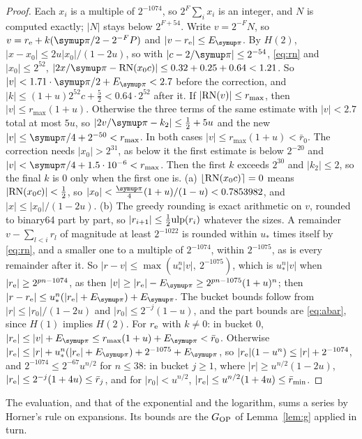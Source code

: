 \begin{proof}
Each $x_i$ is a multiple of $2^{-1074}$, so $2^F\sum_i x_i$ is an integer, and $N$ is computed exactly; $|N|$ stays
below $2^{F+54}$. Write $v = 2^{-F}N$, so $v = r_{\rm e} + k(\cpi/2 - 2^{-F}P)$ and $|v - r_{\rm e}| \le E_{\cpi}$. By $H(2)$,
$|x - x_0| \le 2u|x_0|/(1-2u)$, so with $|c - 2/\cpi| \le 2^{-54}$, \eqref{eq:rn} and $|x_0| \le 2^{52}$,
$|2x/\cpi - \RN(x_0c)| \le 0.32 + 0.25 + 0.64 < 1.21$. So $|v| < 1.71\cdot\cpi/2 + E_{\cpi} < 2.7$ before the
correction, and $|k| \le (1+u)2^{52}c + \frac52 < 0.64\cdot2^{52}$ after it. If $|\mathrm{RN}(v)| \le r_{\max}$, then $|v| \le
r_{\max}(1+u)$. Otherwise the three terms of the same estimate with $|v| < 2.7$ total at most $5u$, so $|2v/\cpi - k_2| \le
\frac12 + 5u$ and the new $|v| \le \cpi/4 + 2^{-50} < r_{\max}$. In both cases $|v| \le r_{\max}(1+u) < \bar r_0$. The correction
needs $|x_0| > 2^{31}$, as below it the first estimate is below $2^{-20}$ and $|v| < \cpi/4 + 1.5\cdot10^{-6} < r_{\max}$.
Then the first $k$ exceeds $2^{30}$ and $|k_2| \le 2$, so the final $k$ is 0 only when the first one is. (a)
$\lfloor\mathrm{RN}(x_0c)\rceil = 0$ means $|\mathrm{RN}(x_0c)| < \frac12$, so $|x_0| < \frac\cpi4(1+u)/(1-u) < 0.7853982$, and $|x| \le
|x_0|/(1-2u)$. (b) The greedy rounding is exact arithmetic on $v$, rounded to binary64 part by part, so $|r_{i+1}| \le
\frac12\mathrm{ulp}(r_i)$ whatever the sizes. A remainder $v - \sum_{l<i}r_l$ of magnitude at least $2^{-1022}$ is rounded
within $u_*$ times itself by \eqref{eq:rn}, and a smaller one to a multiple of $2^{-1074}$, within $2^{-1075}$, as is
every remainder after it. So $|r - v| \le \max(u_*^n|v|,\ 2^{-1075})$, which is $u_*^n|v|$ when $|r_{\rm e}| \ge
2^{pn-1074}$, as then $|v| \ge |r_{\rm e}| - E_{\cpi} \ge 2^{pn-1075}(1+u)^n$; then $|r - r_{\rm e}| \le u_*^n(|r_{\rm e}|
+ E_{\cpi}) + E_{\cpi}$. The bucket bounds follow from $|r| \le
|r_0|/(1-2u)$ and $|r_0| \le 2^{-j}(1-u)$, and the part bounds are \eqref{eq:abar}, since $H(1)$ implies $H(2)$. For
$r_{\rm e}$ with $k \ne 0$: in bucket 0, $|r_{\rm e}| \le |v| + E_{\cpi} \le r_{\max}(1+u) + E_{\cpi} < \bar r_0$. Otherwise
$|r_{\rm e}| \le |r| + u_*^n(|r_{\rm e}| + E_{\cpi}) + 2^{-1075} + E_{\cpi}$, so $|r_{\rm e}|(1 - u^n) \le |r| + 2^{-1074}$,
and $2^{-1074} \le 2^{-67}u^{n/2}$ for $n \le 38$: in bucket $j \ge 1$, where $|r| \ge u^{n/2}(1-2u)$, $|r_{\rm e}| \le
2^{-j}(1 + 4u) \le \bar r_j$, and for $|r_0| < u^{n/2}$, $|r_{\rm e}| \le u^{n/2}(1 + 4u) \le \bar r_{\min}$.
\end{proof}

 The evaluation, and that of the exponential and the logarithm, sums a series by Horner's
rule on expansions. Its bounds are the $G_{\rm OP}$ of Lemma~\ref{lem:g} applied in turn.

